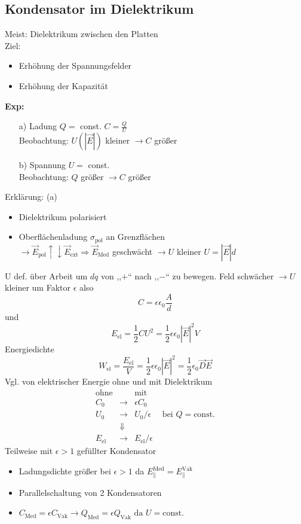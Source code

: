 \documentclass[titlepage,12pt,a4paper,ngerman]{report}
\newcommand{\tx}[1]{\textrm{#1}}
\begin{document}
\subsection{Kondensator im Dielektrikum}
Meist: Dielektrikum zwischen den Platten \\
Ziel: \begin{itemize}
\item Erhöhung der Spannungsfelder
\item Erhöhung der Kapazität
\end{itemize}
\textbf{Exp:} \begin{itemize}
\item[a)] Ladung $Q =$ const. $C = \frac{Q}{U}$\\
Beobachtung: $U(|\vec{E}|) $ kleiner $\rightarrow C$ größer
\item[b)] Spannung $U = $ const. \\
Beobachtung: $Q$ größer $\rightarrow C$ größer
\end{itemize}
Erklärung: (a)
\begin{itemize}
\item Dielektrikum polarisiert
\item Oberflächenladung $\sigma_{\tx{pol}}$ an Grenzflächen\\
$\rightarrow \vec{E}_{\tx{pol}} \uparrow \downarrow \vec{E}_{\tx{ext}} \Rightarrow \vec{E}_{\tx{Med}} $ geschwächt $\rightarrow U$ kleiner $ U = |\vec{E}|d$
\end{itemize}
U def. über Arbeit um $dq$ von ,,$+$`` nach ,,$-$`` zu bewegen. Feld schwächer $\rightarrow U$ kleiner um Faktor $\epsilon$ also
$$\boxed{ C = \epsilon \epsilon_0 \frac{A}{d} }$$
und $$E_{\tx{el}} = \frac{1}{2} C U^2 = \frac{1}{2} \epsilon \epsilon_0 |\vec{E}|^2 V$$
Energiedichte $$W_{\tx{el}} = \frac{E_{\tx{el}}}{V} = \frac{1}{2} \epsilon\epsilon_0 | \vec{E} | ^2 = \frac{1}{2} \epsilon_0 \vec{D} \vec{E}$$
Vgl. von elektrischer Energie ohne und mit Dielektrikum
$$\begin{array}{cccc}
\tx{ohne}&&\tx{mit} \\
C_0 & \rightarrow & \epsilon C_0 \\
U_0 & \rightarrow & U_0/ \epsilon & \tx{ bei } Q = \tx{const.} \\
& \Downarrow\\
E_{\tx{el}} &\rightarrow & E_{\tx{el}} / \epsilon
\end{array}$$
Teilweise mit $\epsilon > 1$ gefüllter Kondensator
\begin{itemize}
\item Ladungsdichte größer bei $ \epsilon >1 $ da $E_{\parallel}^{\tx{Med}} = E_{\parallel}^{\tx{Vak}}$
\item Parallelschaltung von 2 Kondensatoren
\item $ C_{\tx{Med}} = \epsilon C_{\tx{Vak}} \rightarrow Q_{\tx{Med}} = \epsilon Q_{\tx{Vak}} \tx{ da } U = \tx{const.}$
\end{itemize}
\end{document}
